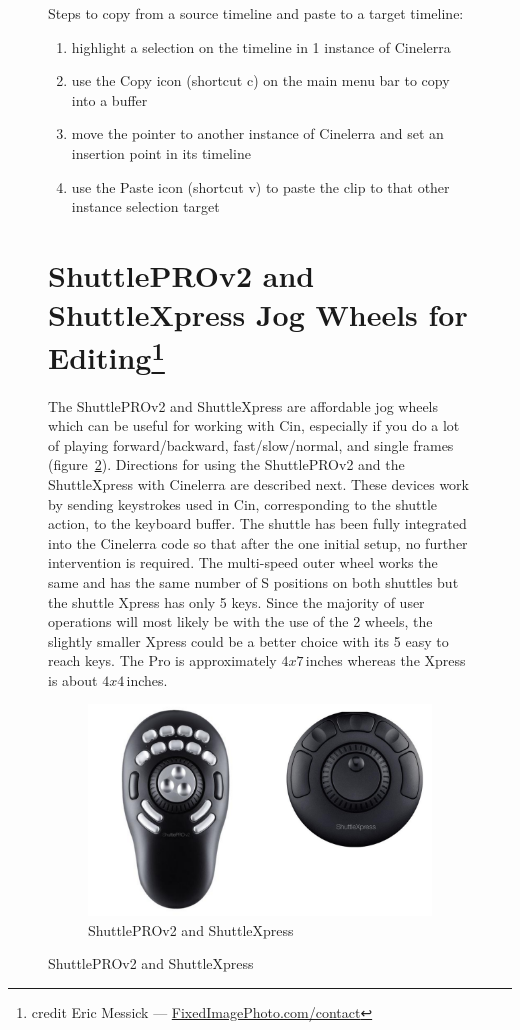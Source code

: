 \begin{figure}
\noindent Steps to copy from a source timeline and paste to a target timeline:

\begin{enumerate}
    \item highlight a selection on the timeline in 1 instance of Cinelerra
    \item use the Copy icon (shortcut c)  on the main menu bar to copy into a buffer
    \item move the pointer to another instance of Cinelerra and set an insertion point in its timeline
    \item use the Paste icon (shortcut v) to paste the clip to that other instance selection target
\end{enumerate}

\section[ShuttlePROv2 and ShuttleXpress Jog Wheels for Editing]{ShuttlePROv2 and ShuttleXpress Jog Wheels for Editing\protect\footnote{credit Eric Messick --- \url{FixedImagePhoto.com/contact}}}%
\label{sec:shuttle_jog_wheels_editing}


The ShuttlePROv2 and ShuttleXpress are affordable jog wheels which can be useful for working with Cin, especially if you do a lot of playing forward/backward, fast/slow/normal, and single frames (figure~\ref{fig:shuttle}).
Directions for using the ShuttlePROv2 and the ShuttleXpress with Cinelerra are described next. These devices work by sending keystrokes used in Cin, corresponding to the shuttle action, to the keyboard buffer. The shuttle has been fully integrated into the Cinelerra code so that after the one initial setup, no further intervention is required.  The multi-speed outer wheel works the same and has the same number of S positions on both shuttles but the shuttle Xpress has only 5 keys.  Since the majority of user operations will most likely be with the use of the 2 wheels, the slightly smaller Xpress could be a better choice with its 5 easy to reach keys.  The Pro is approximately $4x7$\,inches whereas the Xpress is about $4x4$\,inches.

\begin{figure}[htpb]
    \centering
    \includegraphics[width=0.9\linewidth]{images/shuttle.png}
    \caption{ShuttlePROv2 and ShuttleXpress}
    \label{fig:shuttle}
\end{figure}


\end{figure}
